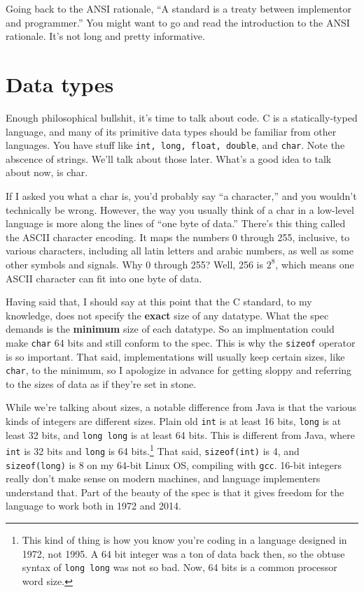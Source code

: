\documentclass[ebook,11pt,oneside,openany]{memoir}
\newcommand{\cf}[1]{\texttt{#1}}
\begin{document}
Going back to the ANSI rationale, ``A standard is a treaty between implementor and programmer.'' You might want to go and read the introduction to the ANSI rationale. It's not long and pretty informative.

\section{Data types}

Enough philosophical bullshit, it's time to talk about code. C is a statically-typed language, and many of its primitive data types should be familiar from other languages. You have stuff like \cf{int, long, float, double}, and \cf{char}. Note the abscence of strings. We'll talk about those later. What's a good idea to talk about now, is char. 

If I asked you what a char is, you'd probably say ``a character,'' and you wouldn't technically be wrong. However, the way you usually think of a char in a low-level language is more along the lines of ``one byte of data.'' There's this thing called the ASCII character encoding. It maps the numbers 0 through 255, inclusive, to various characters, including all latin letters and arabic numbers, as well as some other symbols and signals. Why 0 through 255? Well, 256 is $2^8$, which means one ASCII character can fit into one byte of data.

Having said that, I should say at this point that the C standard, to my knowledge, does not specify the \textbf{exact} size of any datatype. What the spec demands is the \textbf{minimum} size of each datatype. So an implmentation could make \cf{char} 64 bits and still conform to the spec. This is why the \cf{sizeof} operator is so important. That said, implementations will usually keep certain sizes, like \cf{char}, to the minimum, so I apologize in advance for getting sloppy and referring to the sizes of data as if they're set in stone.

While we're talking about sizes, a notable difference from Java is that the various kinds of integers are different sizes. Plain old \cf{int} is at least 16 bits, \cf{long} is at least 32 bits, and \cf{long long} is at least 64 bits. This is different from Java, where \cf{int} is 32 bits and \cf{long} is 64 bits.\footnote{This kind of thing is how you know you're coding in a language designed in 1972, not 1995. A 64 bit integer was a ton of data back then, so the obtuse syntax of \cf{long long} was not so bad. Now, 64 bits is a common processor word size.} That said, \cf{sizeof(int)} is 4, and \cf{sizeof(long)} is 8 on my 64-bit Linux OS, compiling with \cf{gcc}. 16-bit integers really don't make sense on modern machines, and language implementers understand that. Part of the beauty of the spec is that it gives freedom for the language to work both in 1972 and 2014.
\end{document}
